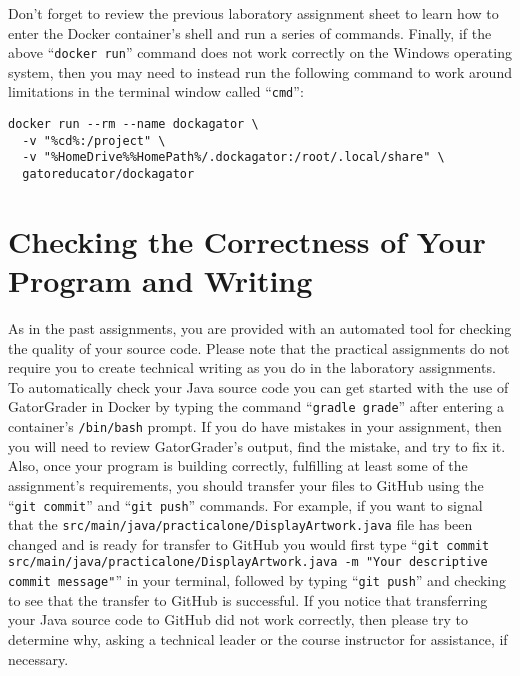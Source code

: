 \documentclass[11pt]{article}
\newcommand{\mainprogramsource}{\lstinline{src/main/java/practicalone/DisplayArtwork.java}}
\newcommand{\gatorgraderstart}{\command{gradle grade}}
\newcommand{\gitcommit}{\command{git commit}}
\newcommand{\gitpush}{\command{git push}}
\newcommand{\gitcommitmainprogram}{\command{git commit src/main/java/practicalone/DisplayArtwork.java -m "Your
descriptive commit message"}}
\newcommand{\command}[1]{``\lstinline{#1}''}
\newcommand{\program}[1]{\lstinline{#1}}
\begin{document}
Don't forget to review the previous laboratory assignment sheet to learn how to
enter the Docker container's shell and run a series of commands. Finally, if the
above \command{docker run} command does not work correctly on the Windows
operating system, then you may need to instead run the following command to work
around limitations in the terminal window called \command{cmd}:

\begin{verbatim}
docker run --rm --name dockagator \
  -v "%cd%:/project" \
  -v "%HomeDrive%%HomePath%/.dockagator:/root/.local/share" \
  gatoreducator/dockagator
\end{verbatim}


\section*{Checking the Correctness of Your Program and Writing}

As in the past assignments, you are provided with an automated tool for checking
the quality of your source code. Please note that the practical assignments do
not require you to create technical writing as you do in the laboratory
assignments. To automatically check your Java source code you can get started
with the use of GatorGrader in Docker by typing the command \gatorgraderstart{}
after entering a container's \program{/bin/bash} prompt. If you do have mistakes
in your assignment, then you will need to review GatorGrader's output, find the
mistake, and try to fix it. Also, once your program is building correctly,
fulfilling at least some of the assignment's requirements, you should transfer
your files to GitHub using the \gitcommit{} and \gitpush{} commands. For
example, if you want to signal that the \mainprogramsource{} file has been
changed and is ready for transfer to GitHub you would first type
\gitcommitmainprogram{} in your terminal, followed by typing \gitpush{} and
checking to see that the transfer to GitHub is successful. If you notice that
transferring your Java source code to GitHub did not work correctly, then please
try to determine why, asking a technical leader or the course instructor for
assistance, if necessary.
\end{document}
